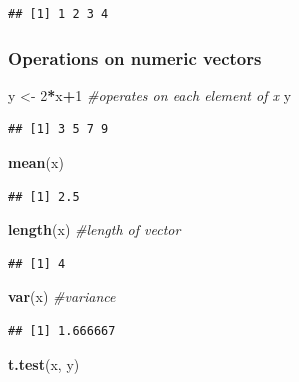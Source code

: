 \documentclass[]{article}
\newenvironment{Shaded}{\begin{snugshade}}{\end{snugshade}}
\newcommand{\KeywordTok}[1]{\textcolor[rgb]{0.13,0.29,0.53}{\textbf{#1}}}
\newcommand{\DecValTok}[1]{\textcolor[rgb]{0.00,0.00,0.81}{#1}}
\newcommand{\StringTok}[1]{\textcolor[rgb]{0.31,0.60,0.02}{#1}}
\newcommand{\CommentTok}[1]{\textcolor[rgb]{0.56,0.35,0.01}{\textit{#1}}}
\newcommand{\OperatorTok}[1]{\textcolor[rgb]{0.81,0.36,0.00}{\textbf{#1}}}
\newcommand{\NormalTok}[1]{#1}
\begin{document}
\begin{verbatim}
## [1] 1 2 3 4
\end{verbatim}

\subsubsection{Operations on numeric
vectors}\label{operations-on-numeric-vectors}

\begin{Shaded}
\begin{Highlighting}[]
\NormalTok{y <-}\StringTok{ }\DecValTok{2}\OperatorTok{*}\NormalTok{x}\OperatorTok{+}\DecValTok{1} \CommentTok{#operates on each element of x}
\NormalTok{y}
\end{Highlighting}
\end{Shaded}

\begin{verbatim}
## [1] 3 5 7 9
\end{verbatim}

\begin{Shaded}
\begin{Highlighting}[]
\KeywordTok{mean}\NormalTok{(x)}
\end{Highlighting}
\end{Shaded}

\begin{verbatim}
## [1] 2.5
\end{verbatim}

\begin{Shaded}
\begin{Highlighting}[]
\KeywordTok{length}\NormalTok{(x) }\CommentTok{#length of vector}
\end{Highlighting}
\end{Shaded}

\begin{verbatim}
## [1] 4
\end{verbatim}

\begin{Shaded}
\begin{Highlighting}[]
\KeywordTok{var}\NormalTok{(x) }\CommentTok{#variance}
\end{Highlighting}
\end{Shaded}

\begin{verbatim}
## [1] 1.666667
\end{verbatim}

\begin{Shaded}
\begin{Highlighting}[]
\KeywordTok{t.test}\NormalTok{(x, y)}
\end{Highlighting}
\end{Shaded}
\end{document}
